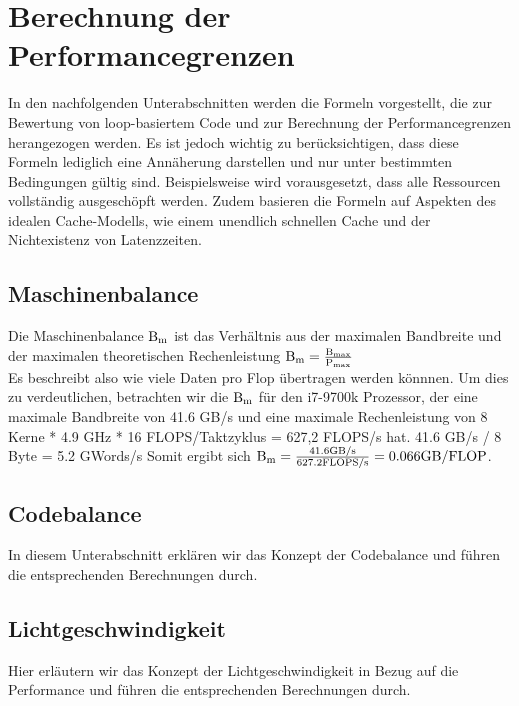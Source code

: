 \documentclass{article}
\begin{document}
    \section{Berechnung der Performancegrenzen}
    In den nachfolgenden Unterabschnitten werden die Formeln vorgestellt, 
    die zur Bewertung von loop-basiertem Code und zur Berechnung der Performancegrenzen herangezogen werden. 
    Es ist jedoch wichtig zu berücksichtigen, dass diese Formeln lediglich eine Annäherung darstellen 
    und nur unter bestimmten Bedingungen gültig sind. Beispielsweise wird vorausgesetzt, 
    dass alle Ressourcen vollständig ausgeschöpft werden. 
    Zudem basieren die Formeln auf Aspekten des idealen Cache-Modells, 
    wie einem unendlich schnellen Cache und der Nichtexistenz von Latenzzeiten.


    \subsection{Maschinenbalance}
    Die Maschinenbalance $\textnormal{B}_{\textnormal{m}}$ ist das Verhältnis 
    aus der maximalen Bandbreite und der maximalen theoretischen Rechenleistung
    $\textnormal{B}_{\textnormal{m}} = \frac{\textnormal{B}_{\textnormal{max}}}{\textnormal{P}_{\textnormal{max}}}$ \\
    Es beschreibt also wie viele Daten pro Flop übertragen werden könnnen. Um dies zu verdeutlichen, 
    betrachten wir die $\textnormal{B}_{\textnormal{m}}$ für den i7-9700k Prozessor,     %
    der eine maximale Bandbreite von 41.6 GB/s und eine maximale Rechenleistung von 8 Kerne * 4.9 GHz * 16 FLOPS/Taktzyklus = 627,2 FLOPS/s hat.
    41.6 GB/s  / 8 Byte = 5.2 GWords/s
    Somit ergibt sich $\textnormal{B}_{\textnormal{m}} = \frac{41.6 \textnormal{GB/s}}{627.2 \textnormal{FLOPS/s}} = 0.066 \textnormal{GB/FLOP}$.
    
    
    \subsection{Codebalance}
    In diesem Unterabschnitt erklären wir das Konzept der Codebalance und führen die entsprechenden Berechnungen durch.
    
    \subsection{Lichtgeschwindigkeit}
    Hier erläutern wir das Konzept der Lichtgeschwindigkeit in Bezug auf die Performance und führen die entsprechenden Berechnungen durch.
    
\end{document}
